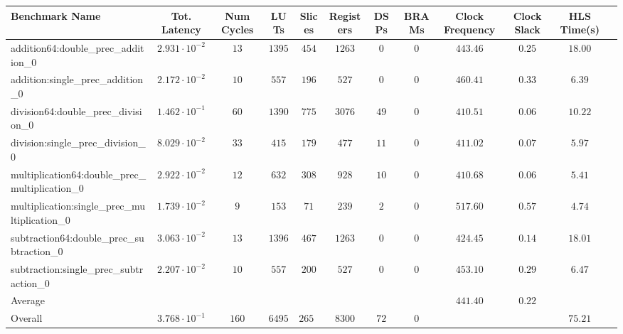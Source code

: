 \begin{tabular}{|l|c|c|c|c|c|c|c|c|c|c|c|}
\hline
Benchmark Name                                   & Tot. Latency            & Num Cycles & LUTs     & Slices   & Registers & DSPs   & BRAMs & Clock Frequency & Clock Slack & HLS Time(s) \\
\hline
addition64:double\_prec\_addition\_0             & $ 2.931 \cdot 10^{-2} $ & $ 13     $ & $ 1395 $ & $ 454  $ & $ 1263  $ & $ 0  $ & $ 0 $ & $ 443.46      $ & $ 0.25    $ & $ 18.00   $ \\
addition:single\_prec\_addition\_0               & $ 2.172 \cdot 10^{-2} $ & $ 10     $ & $ 557  $ & $ 196  $ & $ 527   $ & $ 0  $ & $ 0 $ & $ 460.41      $ & $ 0.33    $ & $ 6.39    $ \\
division64:double\_prec\_division\_0             & $ 1.462 \cdot 10^{-1} $ & $ 60     $ & $ 1390 $ & $ 775  $ & $ 3076  $ & $ 49 $ & $ 0 $ & $ 410.51      $ & $ 0.06    $ & $ 10.22   $ \\
division:single\_prec\_division\_0               & $ 8.029 \cdot 10^{-2} $ & $ 33     $ & $ 415  $ & $ 179  $ & $ 477   $ & $ 11 $ & $ 0 $ & $ 411.02      $ & $ 0.07    $ & $ 5.97    $ \\
multiplication64:double\_prec\_multiplication\_0 & $ 2.922 \cdot 10^{-2} $ & $ 12     $ & $ 632  $ & $ 308  $ & $ 928   $ & $ 10 $ & $ 0 $ & $ 410.68      $ & $ 0.06    $ & $ 5.41    $ \\
multiplication:single\_prec\_multiplication\_0   & $ 1.739 \cdot 10^{-2} $ & $ 9      $ & $ 153  $ & $ 71   $ & $ 239   $ & $ 2  $ & $ 0 $ & $ 517.60      $ & $ 0.57    $ & $ 4.74    $ \\
subtraction64:double\_prec\_subtraction\_0       & $ 3.063 \cdot 10^{-2} $ & $ 13     $ & $ 1396 $ & $ 467  $ & $ 1263  $ & $ 0  $ & $ 0 $ & $ 424.45      $ & $ 0.14    $ & $ 18.01   $ \\
subtraction:single\_prec\_subtraction\_0         & $ 2.207 \cdot 10^{-2} $ & $ 10     $ & $ 557  $ & $ 200  $ & $ 527   $ & $ 0  $ & $ 0 $ & $ 453.10      $ & $ 0.29    $ & $ 6.47    $ \\
\hline
Average                                          & $                     $ & $        $ & $      $ & $      $ & $       $ & $    $ & $   $ & $ 441.40      $ & $ 0.22    $ & $         $ \\
\hline
Overall                                          & $ 3.768 \cdot 10^{-1} $ & $ 160    $ & $ 6495 $ & $ 2650 $ & $ 8300  $ & $ 72 $ & $ 0 $ & $             $ & $         $ & $ 75.21   $ \\
\hline
\end{tabular}
